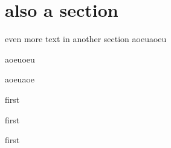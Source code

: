 \section{also a section}
even more text in another section
aoeuaoeu

aoeuoeu \cite{Hansen_2015}

aoeuaoe \cite{Hansen_2011}

first

first

first
